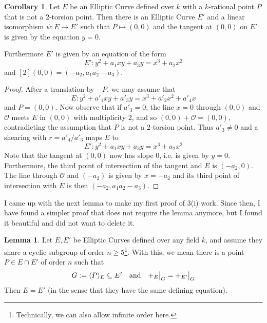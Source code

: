 \documentclass{scrartcl}
\renewcommand{\O}{\mathcal{O}}
\newcommand\restr[2]{{
    \left.\kern-\nulldelimiterspace
    #1
    \vphantom{\big|}
    \right|_{#2}
}}
\theoremstyle{definition}
\newtheorem{lemma}[subsection]{Lemma}
\newtheorem{corollary}[subsection]{Corollary}
\begin{document}
\begin{corollary}
    \label{prop:point_normalization}
    Let $E$ be an Elliptic Curve defined over $k$ with a $k$-rational point $P$ that is not a 2-torsion point.
    Then there is an Elliptic Curve $E'$ and a linear isomorphism $\psi: E \to E'$ such that $P \mapsto (0, 0)$ and the tangent at $(0, 0)$ on $E'$ is given by the equation $y = 0$.
    
    Furthermore $E'$ is given by an equation of the form
    \begin{equation*}
        E': y^2 + a_1 x y + a_3 y = x^3 + a_2 x^2
    \end{equation*}
    and $[2](0, 0) = (-a_2, a_1 a_2 - a_3)$.
\end{corollary}
\begin{proof}
    After a translation by $-P$, we may assume that
    \begin{equation*}
        E: y^2 + a'_1 x y + a'_3 y = x^3 + a'_2 x^2 + a'_4 x
    \end{equation*}
    and $P = (0, 0)$.
    Now observe that if $a'_3 = 0$, the line $x = 0$ through $(0, 0)$ and $\O$ meets $E$ in $(0, 0)$ with multiplicity 2, and so $(0, 0) + \O = (0, 0)$, contradicting the assumption that $P$ is not a 2-torsion point.
    Thus $a'_3 \neq 0$ and a shearing with $r = a'_4 / a'_3$ maps $E$ to
    \begin{equation*}
        E': y^2 + a_1 x y + a_3 y = x^3 + a_2 x^2
    \end{equation*}
    Note that the tangent at $(0, 0)$ now has slope $0$, i.e. is given by $y = 0$.
    Furthermore, the third point of intersection of the tangent and $E$ is $(-a_2, 0)$.
    The line through $\O$ and $(-a_2)$ is given by $x = -a_2$ and its third point of intersection with $E$ is then $(-a_2, a_1a_2 - a_3)$. 
\end{proof}
I came up with the next lemma to make my first proof of 3(i) work.
Since then, I have found a simpler proof that does not require the lemma anymore, but I found it beautiful and did not want to delete it.
\begin{lemma}
    \label{prop:share_subgroup_equal}
    Let $E, E'$ be Elliptic Curves defined over any field $k$, and assume they share a cyclic subgroup of order $n \geq 5$\footnote{Technically, we can also allow infinite order here.}.
    With this, we mean there is a point $P \in E \cap E'$ of order $n$ such that
    \begin{equation*}
        G := \langle P \rangle_E \subseteq E' \quad \text{and} \quad \restr{+_E}{G} = \restr{+_{E'}}{G}
    \end{equation*}
    Then $E = E'$ (in the sense that they have the same defining equation).
\end{lemma}
\end{document}
